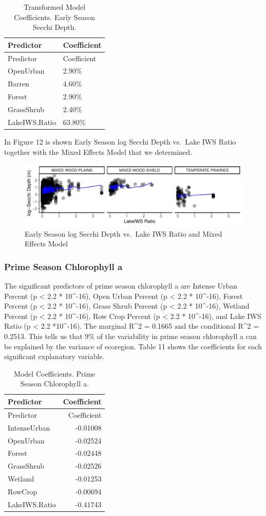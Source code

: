 \documentclass[12pt,]{article}
\begin{document}
\begin{longtable}[]{@{}ll@{}}
\caption{Transformed Model Coefficients. Early Season Secchi
Depth.}\tabularnewline
\toprule
Predictor & Coefficient\tabularnewline
\midrule
\endfirsthead
\toprule
Predictor & Coefficient\tabularnewline
\midrule
\endhead
OpenUrban & 2.90\%\tabularnewline
Barren & 4.60\%\tabularnewline
Forest & 2.90\%\tabularnewline
GrassShrub & 2.40\%\tabularnewline
LakeIWS.Ratio & 63.80\%\tabularnewline
\bottomrule
\end{longtable}

In Figure 12 is shown Early Season log Secchi Depth vs.~Lake IWS Ratio
together with the Mixed Effects Model that we determined.

\begin{figure}
\centering
\includegraphics{Bollt_Greif_Raby_Roth_Project_Final_files/figure-latex/unnamed-chunk-22-1.pdf}
\caption{Early Season log Secchi Depth vs.~Lake IWS Ratio and Mixed
Effects Model}
\end{figure}

\hypertarget{prime-season-chlorophyll-a}{%
\subsubsection{Prime Season Chlorophyll
a}\label{prime-season-chlorophyll-a}}

The significant predictors of prime season chlorophyll a are Intense
Urban Percent (p \textless{} 2.2 * 10\^{}-16), Open Urban Percent (p
\textless{} 2.2 * 10\^{}-16), Forest Percent (p \textless{} 2.2 *
10\^{}-16), Grass Shrub Percent (p \textless{} 2.2 * 10\^{}-16), Wetland
Percent (p \textless{} 2.2 * 10\^{}-16), Row Crop Percent (p \textless{}
2.2 * 10\^{}-16), and Lake IWS Ratio (p \textless{} 2.2 *10\^{}-16). The
marginal R\^{}2 = 0.1665 and the conditional R\^{}2 = 0.2513. This tells
us that 9\% of the variability in prime season chlorophyll a can be
explained by the variance of ecoregion. Table 11 shows the coefficients
for each significant explanatory variable.

\begin{longtable}[]{@{}lr@{}}
\caption{Model Coefficients. Prime Season Chlorophyll a.}\tabularnewline
\toprule
Predictor & Coefficient\tabularnewline
\midrule
\endfirsthead
\toprule
Predictor & Coefficient\tabularnewline
\midrule
\endhead
IntenseUrban & -0.01008\tabularnewline
OpenUrban & -0.02524\tabularnewline
Forest & -0.02448\tabularnewline
GrassShrub & -0.02526\tabularnewline
Wetland & -0.01253\tabularnewline
RowCrop & -0.00694\tabularnewline
LakeIWS.Ratio & -0.41743\tabularnewline
\bottomrule
\end{longtable}
\end{document}

